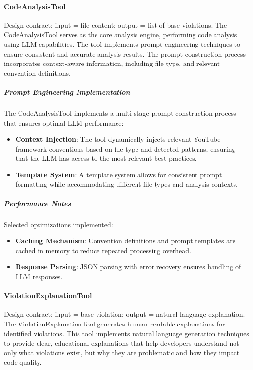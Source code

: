 \begin{spacing}{1.2}
\paragraph{CodeAnalysisTool}
Design contract: input = file content; output = list of base violations.
The CodeAnalysisTool serves as the core analysis engine, performing code analysis using LLM capabilities. The tool implements prompt engineering techniques to ensure consistent and accurate analysis results. The prompt construction process incorporates context-aware information, including file type, and relevant convention definitions.

\subparagraph{Prompt Engineering Implementation}
The CodeAnalysisTool implements a multi-stage prompt construction process that ensures optimal LLM performance:

\begin{itemize}
    \item \textbf{Context Injection}: The tool dynamically injects relevant YouTube framework conventions based on file type and detected patterns, ensuring that the LLM has access to the most relevant best practices.
    \item \textbf{Template System}: A template system allows for consistent prompt formatting while accommodating different file types and analysis contexts.
\end{itemize}


\subparagraph{Performance Notes}
Selected optimizations implemented:

\begin{itemize}
    \item \textbf{Caching Mechanism}: Convention definitions and prompt templates are cached in memory to reduce repeated processing overhead.
    \item \textbf{Response Parsing}: JSON parsing with error recovery ensures handling of LLM responses.
\end{itemize}

\paragraph{ViolationExplanationTool}
Design contract: input = base violation; output = natural-language explanation.
The ViolationExplanationTool generates human-readable explanations for identified violations. This tool implements natural language generation techniques to provide clear, educational explanations that help developers understand not only what violations exist, but why they are problematic and how they impact code quality.


\end{spacing}
